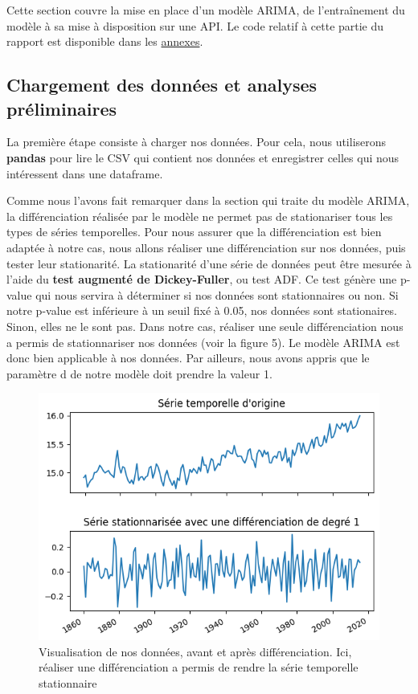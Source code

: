 \documentclass[french]{article}
\begin{document}
    Cette section couvre la mise en place d'un modèle ARIMA, de l'entraînement du modèle à sa mise à disposition sur une API. Le code relatif à cette partie du rapport est disponible dans les \hyperref[sec:code]{annexes}.

    \subsection{Chargement des données et analyses préliminaires}

    La première étape consiste à charger nos données. Pour cela, nous utiliserons \textbf{pandas} pour lire le CSV qui contient nos données et enregistrer celles qui nous intéressent dans une dataframe. 

    Comme nous l'avons fait remarquer dans la section qui traite du modèle ARIMA, la différenciation réalisée par le modèle ne permet pas de stationariser tous les types de séries temporelles. Pour nous assurer que la différenciation est bien adaptée à notre cas, nous allons réaliser une différenciation sur nos données, puis tester leur stationarité.
    La stationarité d'une série de données peut être mesurée à l'aide du \textbf{test augmenté de Dickey-Fuller}, ou test ADF. Ce test génère une p-value qui nous servira à déterminer si nos données sont stationnaires ou non. Si notre p-value est inférieure à un seuil fixé à 0.05, nos données sont stationaires. Sinon, elles ne le sont pas.
    Dans notre cas, réaliser une seule différenciation nous a permis de stationnariser nos données (voir la figure 5). Le modèle ARIMA est donc bien applicable à nos données. Par ailleurs, nous avons appris que le paramètre d de notre modèle doit prendre la valeur 1.
    \begin{figure}[h]
        \includegraphics[width=12cm]{differenciating}
        \centering
        \caption{Visualisation de nos données, avant et après différenciation. Ici, réaliser une différenciation a permis de rendre la série temporelle stationnaire}
        \centering
    \end{figure}
\end{document}
